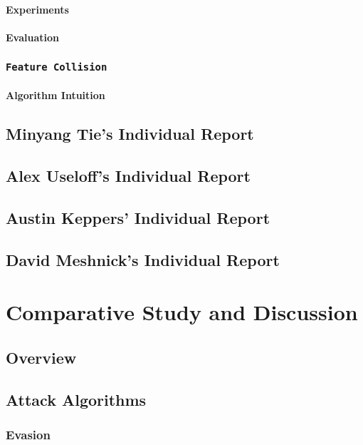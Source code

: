 \documentclass[11pt]{article}
\newcommand{\ilc}{\texttt}
\begin{document}
\paragraph{Experiments}
\paragraph{Evaluation}


\subsubsection{\ilc{Feature Collision}}
\paragraph{Algorithm Intuition}


\subsection{Minyang Tie's Individual Report}


\subsection{Alex Useloff's Individual Report}


\subsection{Austin Keppers' Individual Report}


\subsection{David Meshnick's Individual Report}

\section{Comparative Study and Discussion}

\subsection{Overview}
\subsection{Attack Algorithms}
\subsubsection{Evasion}
\end{document}
